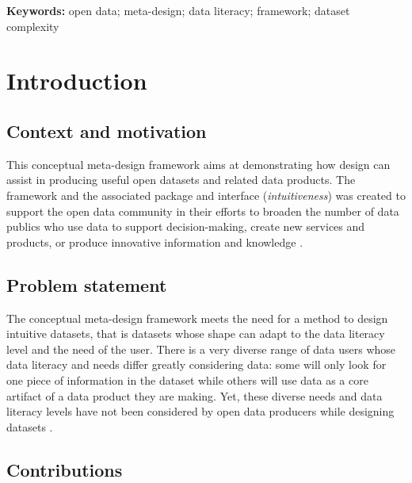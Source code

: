 \documentclass[12pt,a4paper]{article}
\begin{document}
\textbf{Keywords:} open data; meta-design; data literacy; framework; dataset complexity



\section{Introduction}

\subsection{Context and motivation}

This conceptual meta-design framework aims at demonstrating how design can assist in producing useful open datasets and related data products. The framework and the associated package and interface (\textit{intuitiveness}) was created to support the open data community in their efforts to broaden the number of data publics \citep{ruppert2012} who use data to support decision-making, create new services and products, or produce innovative information and knowledge \citep{safarov2017}.

\subsection{Problem statement}

The conceptual meta-design framework meets the need for a method to design intuitive datasets, that is datasets whose shape can adapt to the data literacy level and the need of the user. There is a very diverse range of data users whose data literacy and needs differ greatly considering data: some will only look for one piece of information in the dataset while others will use data as a core artifact of a data product they are making. Yet, these diverse needs and data literacy levels have not been considered by open data producers while designing datasets \citep{dymytrova2018}.

\subsection{Contributions}
\end{document}

